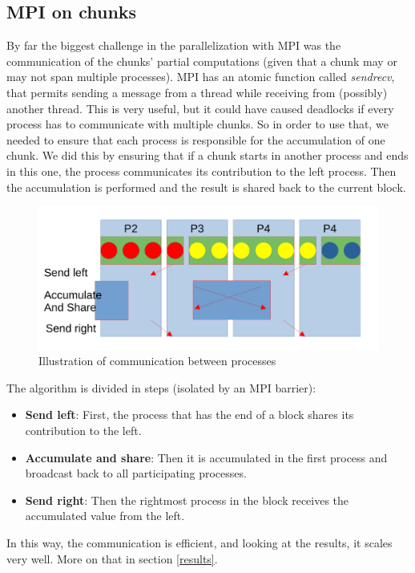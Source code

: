 \documentclass[10pt]{article}
\begin{document}
\begin{multicols}{2}
\subsection*{MPI on chunks}
By far the biggest challenge in the parallelization with MPI was the communication of the chunks' partial computations (given that a chunk may or may not span multiple processes).
MPI has an atomic function called \textit{sendrecv}, that permits sending a message from a thread while receiving from (possibly) another thread.
This is very useful, but it could have caused deadlocks if every process has to communicate with multiple chunks.
So in order to use that, we needed to ensure that each process is responsible for the accumulation of one chunk.
We did this by ensuring that if a chunk starts in another process and ends in this one, the process communicates its contribution to the left process. Then the accumulation is performed and the result is shared back to the current block.

\begin{figure}[H]
  \includegraphics[scale=0.25]{img/MPI.png}
  \centering
  \caption{Illustration of communication between processes}
  \label{fig:MPI}
\end{figure}

The algorithm is divided in steps (isolated by an MPI barrier):
\begin{itemize}
  \item \textbf{Send left}: First, the process that has the end of a block shares its contribution to the left.
  \item \textbf{Accumulate and share}: Then it is accumulated in the first process and broadcast back to all participating processes.
  \item \textbf{Send right}: Then the rightmost process in the block receives the accumulated value from the left.
\end{itemize}

In this way, the communication is efficient, and looking at the results, it scales very well. More on that in section \ref{results}.



\end{multicols}
\end{document}
